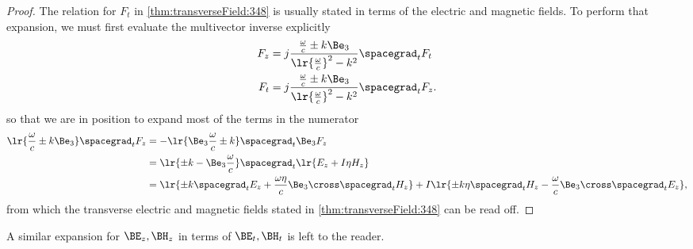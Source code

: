 \begin{proof}
The relation for \( F_t \) in
\cref{thm:transverseField:348}
is usually stated in terms of the electric and magnetic fields.
To perform that expansion, we must first evaluate the multivector inverse explicitly
\begin{equation}\label{eqn:transverseField:348}
\begin{aligned}
F_z &= j \frac{ \frac{\omega}{c} \pm k \Be_3 }{ \lr{\frac{\omega}{c}}^2 - k^2 } \spacegrad_t F_t \\
F_t &= j \frac{ \frac{\omega}{c} \pm k \Be_3 }{ \lr{\frac{\omega}{c}}^2 - k^2 } \spacegrad_t F_z.
\end{aligned}
\end{equation}
so that we are in position to expand most of the terms in the numerator
\begin{equation}\label{eqn:transverseField:268}
\begin{aligned}
\lr{ \frac{\omega}{c} \pm k \Be_3 } \spacegrad_t F_z
&=
-\lr{ \Be_3 \frac{\omega}{c} \pm k } \spacegrad_t \Be_3 F_z \\
&=
\lr{ \pm k - \Be_3 \frac{\omega}{c} } \spacegrad_t \lr{ E_z + I \eta H_z } \\
&=
\lr{
   \pm k \spacegrad_t E_z
   + \frac{\omega \eta}{c} \Be_3 \cross \spacegrad_t H_z
}
+ I \lr{
   \pm k \eta \spacegrad_t H_z
   -
   \frac{\omega}{c}
   \Be_3 \cross \spacegrad_t E_z
},
\end{aligned}
\end{equation}
from which the transverse electric and magnetic fields stated in
\cref{thm:transverseField:348} can be read off.
\end{proof}
A similar expansion for \( \BE_z, \BH_z \) in terms of \( \BE_t, \BH_t \) is left to the reader.



